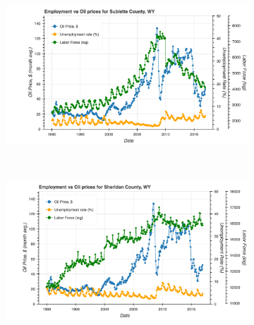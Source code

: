 \documentclass[11pt,letterpaper]{article}
\begin{document}
\begin{figure}
\centering
\begin{subfigure}{0.45\textwidth}
\includegraphics[width=1.1\linewidth]{wy_sublette_oil_price}
\end{subfigure}
~
\begin{subfigure}{0.45\textwidth}
\includegraphics[width=1.1\linewidth]{wy_sheridan_oil_price}
\end{subfigure}


\end{figure}
\end{document}
